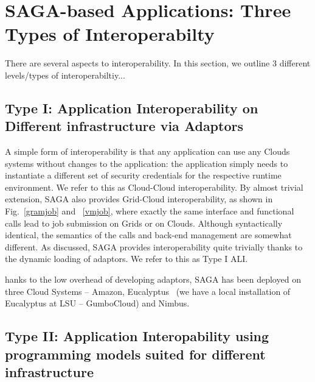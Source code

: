 \documentclass[3p,twocolumn]{elsarticle}
\begin{document}


\section{SAGA-based Applications: Three Types of Interoperabilty}

There are several aspects to interoperability. In this section, we
outline
3 different levels/types of interoperabiltiy...


\subsection{Type I: Application Interoperability on Different
  infrastructure via Adaptors}

A simple form of interoperability is that any application can use any
Clouds systems without changes to the application: the application
simply needs to instantiate a different set of security credentials
for the respective runtime environment. We refer to this as
Cloud-Cloud interoperability. By almost trivial extension, SAGA also
provides Grid-Cloud interoperability, as shown in Fig.~\ref{gramjob}
and ~\ref{vmjob}, where exactly the same interface and functional
calls lead to job submission on Grids or on Clouds. Although
syntactically identical, the semantics of the calls and back-end
management are somewhat different.  As discussed, SAGA provides
interoperability quite trivially thanks to the dynamic loading of
adaptors.  We refer to this as Type I ALI.

hanks to the low overhead of developing adaptors, SAGA has been
deployed on three Cloud Systems -- Amazon,
Eucalyptus~\cite{eucalyptus} (we have a local installation of
Eucalyptus at LSU -- GumboCloud) and Nimbus.




\subsection{Type II: Application Interopability using programming
  models suited for different infrastructure}
\end{document}
